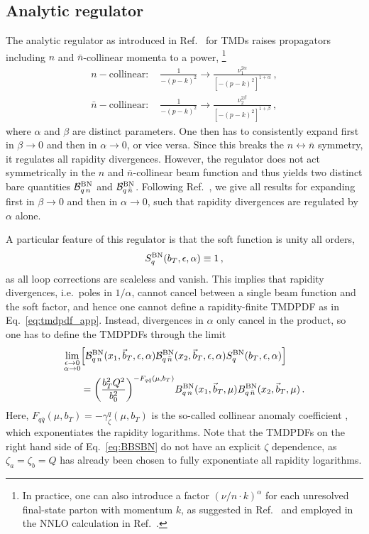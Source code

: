 \documentclass[11pt,a4paper]{article}
\DeclareRobustCommand{\eq}[1]{Eq.~\eqref{eq:#1}}
\DeclareRobustCommand{\mycite}[1]{Ref.~\cite{#1}}
\newcommand{\eps}{\epsilon}
\newcommand{\cB}{\mathcal{B}}
\newcommand{\nn}{\nonumber}
\newcommand{\bn}{{\bar{n}}}
\newcommand{\bt}{\vec b_T}
\begin{document}
\subsection{Analytic regulator}
The analytic regulator as introduced in \mycite{Becher:2010tm} for TMDs
raises propagators including $n$ and $\bn$-collinear momenta to a power,%
\footnote{In practice, one can also introduce a factor $(\nu/n\cdot k)^\alpha$
for each unresolved final-state parton with momentum $k$, as suggested in \mycite{Becher:2011dz}
and employed in the NNLO calculation in \mycite{Gehrmann:2014yya}.}
\begin{align}
  {n-}\text{collinear}:\quad \frac{1}{-(p-k)^2} \to \frac{\nu_1^{2\alpha}}{[-(p - k)^2]^{1+\alpha}}
\,,\\
{\bn-}\text{collinear}:\quad \frac{1}{-(p-k)^2} \to \frac{\nu_2^{2\beta}}{[-(p - k)^2]^{1+\beta}}
\,,\end{align}
where $\alpha$ and $\beta$ are distinct parameters.
One then has to consistently expand first in $\beta\to0$ and then in $\alpha\to0$, or vice versa.
Since this breaks the $n \leftrightarrow \bn$ symmetry, it regulates all rapidity divergences.
However, the regulator does not act symmetrically in the $n$ and $\bn$-collinear beam function and thus yields two distinct bare quantities $\cB_{q\,n}^{\rm BN}$ and $\cB_{q\,\bn}^{\rm BN}$.
Following \mycite{Becher:2010tm}, we give all results for expanding first in $\beta\to0$ and then in $\alpha\to0$, such that rapidity divergences are regulated by $\alpha$ alone.

A particular feature of this regulator is that the soft function is unity all orders,
\begin{equation}
 S_q^{\rm BN}(b_T,\eps,\alpha) \equiv 1
\,,\end{equation}
as all loop corrections are scaleless and vanish.
This implies that rapidity divergences, i.e.\ poles in $1/\alpha$, cannot cancel between  a single beam function and the soft factor, and hence one cannot define a rapidity-finite TMDPDF as in \eq{tmdpdf_app}.
Instead, divergences in $\alpha$ only cancel in the product, so one has to define the TMDPDFs through the limit
\begin{align} \label{eq:BBSBN}
 \lim_{\substack{\eps\to0\\\alpha\to0}} & \Bigl[ \cB_{q\,n}^{\rm BN}(x_1,\bt,\eps,\alpha) \cB_{q\,\bn}^{\rm BN}(x_2,\bt,\eps,\alpha) S_q^{\rm BN}(b_T,\eps,\alpha)\Bigr]
 \nn\\
 & = \biggl(\frac{b_T^2 Q^2}{b_0^2}\biggr)^{-F_{q\bar q}(\mu,b_T)} B_{q\,n}^{\rm BN}(x_1, \bt, \mu) B_{q\,\bn}^{\rm BN}(x_2, \bt, \mu)
\,.\end{align}
Here, $F_{q\bar q}(\mu,b_T) = - \gamma^q_\zeta(\mu,b_T)$ is the so-called collinear anomaly coefficient \cite{Becher:2010tm}, which exponentiates the rapidity logarithms.
Note that the TMDPDFs on the right hand side of \eq{BBSBN} do not have an explicit $\zeta$ dependence, as $\zeta_a = \zeta_b = Q$ has already been chosen to fully exponentiate all rapidity logarithms.
\end{document}
